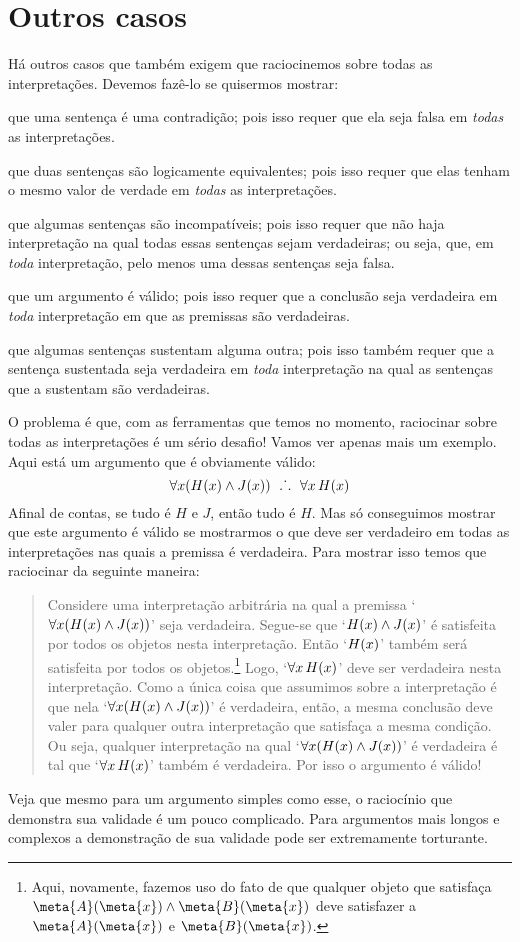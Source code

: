 \section{Outros casos}
Há outros casos que também exigem que raciocinemos sobre todas as interpretações. Devemos fazê-lo se quisermos mostrar:
	\begin{ebullet}
	\item que uma sentença é uma contradição; pois isso requer que ela seja falsa em \emph{todas} as interpretações.
	\item que duas sentenças são logicamente equivalentes; pois isso requer que elas tenham o mesmo valor de verdade em \emph{todas} as interpretações.
	\item que algumas sentenças são incompatíveis; pois isso requer que não haja interpretação na qual todas essas sentenças sejam verdadeiras; ou seja, que, em \emph{toda} interpretação, pelo menos uma dessas sentenças seja falsa.
	\item que um argumento é válido; pois isso requer que a conclusão seja verdadeira em \emph{toda} interpretação em que as premissas são verdadeiras.
	\item que algumas sentenças sustentam alguma outra; pois isso também requer que a sentença sustentada seja verdadeira em \emph{toda} interpretação na qual as sentenças que a sustentam são verdadeiras.
	\end{ebullet}
O problema é que, com as ferramentas que temos no momento, raciocinar sobre todas as interpretações é um sério desafio! Vamos ver apenas mais um exemplo. Aqui está um argumento que é obviamente válido:
	$$\forall x(\atom{H}{x} \eand \atom{J}{x}) \ \therefore \ \forall x\, \atom{H}{x}$$
Afinal de contas, se tudo é $H$ e $J$, então tudo é $H$.
Mas só conseguimos mostrar que este argumento é válido se mostrarmos o que deve ser verdadeiro em todas as interpretações nas quais a premissa é verdadeira.
Para mostrar isso temos que raciocinar da seguinte maneira:
	\begin{quote}
		Considere uma interpretação arbitrária na qual a premissa `$\forall x(\mathord{H}(x) \wedge \mathord{J}(x))$' seja verdadeira.
		Segue-se que `$\mathord{H}(x) \wedge \mathord{J}(x)$' é satisfeita por todos os objetos nesta interpretação.
		Então `$\mathord{H}(x)$' também será satisfeita por todos os objetos.\footnote{
			Aqui, novamente, fazemos uso do fato de que qualquer objeto que satisfaça $\meta{A}(\meta{x}) \land \meta{B}(\meta{x})$ deve satisfazer a $\meta{A}(\meta{x})$ e $\meta{B}(\meta{x})$.
		}
		Logo, `$\forall x\, \mathord{H}(x)$' deve ser verdadeira nesta interpretação.
		Como a única coisa que assumimos sobre a interpretação é que nela `$\forall x(\mathord{H}(x) \wedge \mathord{J}(x))$' é verdadeira, então, a mesma conclusão deve valer para qualquer outra interpretação que satisfaça a mesma condição.
		Ou seja, qualquer interpretação na qual `$\forall x(\mathord{H}(x) \wedge \mathord{J}(x))$' é verdadeira é tal que `$\forall x\, \mathord{H}(x)$' também é verdadeira.
		Por isso o argumento é válido!
\end{quote}
Veja que mesmo para um argumento simples como esse, o raciocínio que demonstra sua validade é um pouco complicado. Para argumentos mais longos e complexos a demonstração de sua validade pode ser extremamente torturante.

